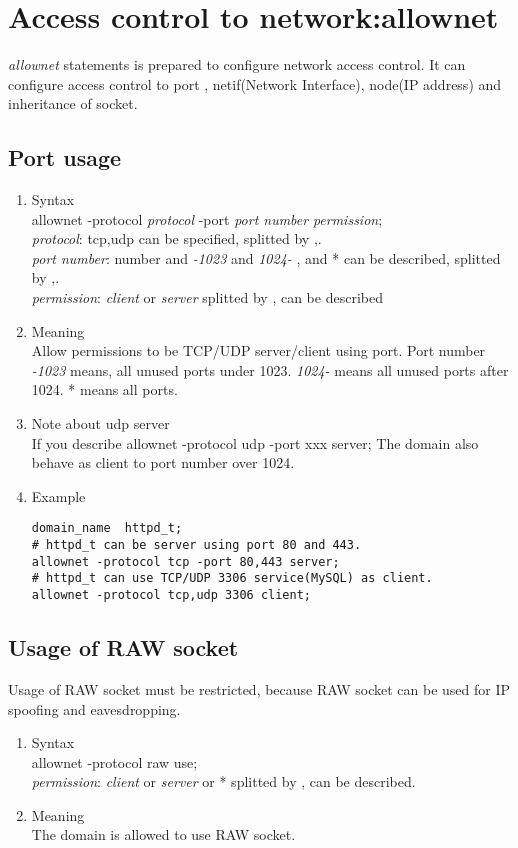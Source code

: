 \documentclass{article}
\begin{document}
\begin{enumerate}
\end{enumerate}



\section{Access control to network:allownet}
{\it allownet} statements is prepared to configure network access control.
It can configure access control to  port , netif(Network
Interface), node(IP address) and inheritance of socket.

\subsection{Port usage}
\begin{enumerate}
 \item Syntax\\
 allownet -protocol {\it protocol} -port {\it port number} {\it permission};\\
 {\it protocol}: tcp,udp can be specified, splitted by ,.\\
 {\it port number}: number and {\it -1023} and {\it 1024-} , and * can
       be described, splitted by ,.\\
 {\it permission}: {\it client} or {\it server} splitted by , can be
       described
 \item Meaning\\
       Allow permissions to be TCP/UDP server/client using port. Port number {\it
       -1023} means, all unused ports under 1023. {\it 1024-} means all
       unused ports after 1024. * means all ports. 
 \item Note about udp server\\
       If you describe allownet -protocol udp -port xxx server;
       The domain also behave as client to port number over 1024.
 \item Example
\begin{verbatim}
domain_name  httpd_t;
# httpd_t can be server using port 80 and 443.
allownet -protocol tcp -port 80,443 server;
# httpd_t can use TCP/UDP 3306 service(MySQL) as client.
allownet -protocol tcp,udp 3306 client;
\end{verbatim}
\end{enumerate}

\subsection{Usage of RAW socket}
Usage of RAW socket must be restricted, because RAW socket can be used
for IP spoofing and eavesdropping.
\begin{enumerate}
 \item Syntax\\
       allownet -protocol raw use;\\
        {\it permission}: {\it client} or {\it server} or * splitted by , can be
       described.
 \item Meaning\\
       The domain is allowed to use RAW socket.
\end{enumerate}
\end{document}
